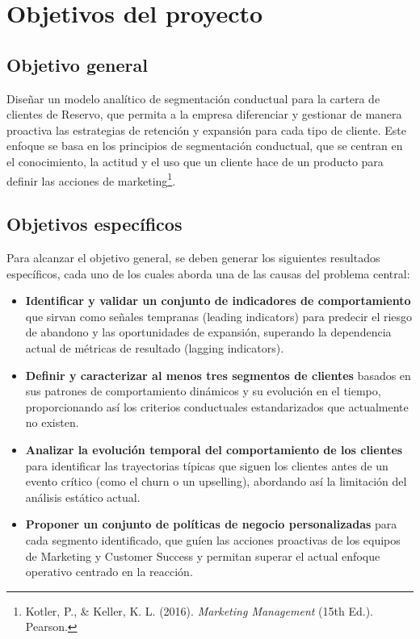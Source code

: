 \section{Objetivos del proyecto}

\subsection{Objetivo general}

Diseñar un modelo analítico de segmentación conductual para la cartera de clientes de Reservo, que permita a la empresa diferenciar y gestionar de manera proactiva las estrategias de retención y expansión para cada tipo de cliente. Este enfoque se basa en los principios de segmentación conductual, que se centran en el conocimiento, la actitud y el uso que un cliente hace de un producto para definir las acciones de marketing\footnote{Kotler, P., \& Keller, K. L. (2016). \textit{Marketing Management} (15th Ed.). Pearson.}.

\subsection{Objetivos específicos}

Para alcanzar el objetivo general, se deben generar los siguientes resultados específicos, cada uno de los cuales aborda una de las causas del problema central:

\begin{itemize}
    \item \textbf{Identificar y validar un conjunto de indicadores de comportamiento} que sirvan como señales tempranas (leading indicators) para predecir el riesgo de abandono y las oportunidades de expansión, superando la dependencia actual de métricas de resultado (lagging indicators).

    \item \textbf{Definir y caracterizar al menos tres segmentos de clientes} basados en sus patrones de comportamiento dinámicos y su evolución en el tiempo, proporcionando así los criterios conductuales estandarizados que actualmente no existen.

    \item \textbf{Analizar la evolución temporal del comportamiento de los clientes} para identificar las trayectorias típicas que siguen los clientes antes de un evento crítico (como el churn o un upselling), abordando así la limitación del análisis estático actual.
    
    \item \textbf{Proponer un conjunto de políticas de negocio personalizadas} para cada segmento identificado, que guíen las acciones proactivas de los equipos de Marketing y Customer Success y permitan superar el actual enfoque operativo centrado en la reacción.
\end{itemize}

